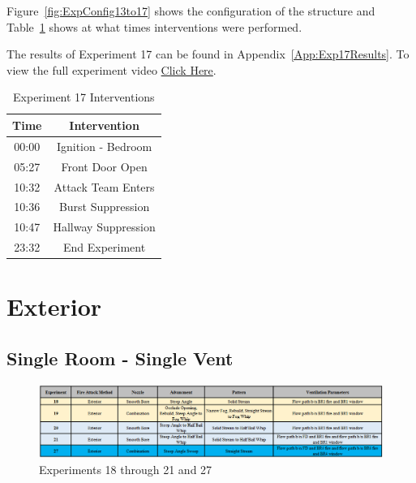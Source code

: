 \documentclass[12pt,oneside]{book}
\begin{document}
Figure~\ref{fig:ExpConfig13to17} shows the configuration of the structure and Table~\ref{Table:Exp17Interventions} shows at what times interventions were performed. 

The results of Experiment 17 can be found in Appendix~\ref{App:Exp17Results}. To view the full experiment video \href{https://youtu.be/gl8rc1Nsl1k}{Click Here}.

\begin{table}[H]
	\centering
	\caption{Experiment 17 Interventions}
	\begin{tabular}{|c|c|} 
		\hline
		Time & Intervention \\ \hline \hline
		00:00 & Ignition - Bedroom \\ \hline
		05:27 & Front Door Open \\ \hline
		10:32 & Attack Team Enters\\ \hline
		10:36 & Burst Suppression \\ \hline 
		10:47 & Hallway Suppression \\ \hline
		23:32 & End Experiment\\ \hline
	\end{tabular}
	\label{Table:Exp17Interventions}
\end{table}

\clearpage

\section{Exterior}

\subsection{Single Room - Single Vent}

\begin{figure}[H]
	\centering
	\includegraphics[width=7in]{Figures/General/Exp18to21and27.png}
	\caption{Experiments 18 through 21 and 27}
	\label{fig:Exp18to21and27}
\end{figure}
\end{document}
